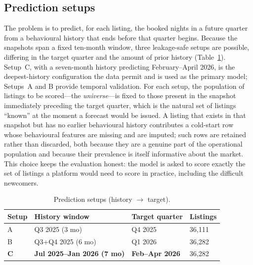 \documentclass[review,12pt]{elsarticle}
\begin{document}
\subsection{Prediction setups}
The problem is to predict, for each listing, the booked nights in a future quarter
from a behavioural history that ends before that quarter begins. Because the
snapshots span a fixed ten-month window, three leakage-safe setups are possible,
differing in the target quarter and the amount of prior history
(Table~\ref{tab:setups}). Setup~C, with a seven-month history predicting
February--April 2026, is the deepest-history configuration the data permit and is
used as the primary model; Setups~A and B provide temporal validation. For each setup, the population of
listings to be scored---the \emph{universe}---is fixed to those present in the
snapshot immediately preceding the target quarter, which is the natural set of
listings ``known'' at the moment a forecast would be issued. A listing that exists
in that snapshot but has no earlier behavioural history contributes a cold-start row
whose behavioural features are missing and are imputed; such rows are retained
rather than discarded, both because they are a genuine part of the operational
population and because their prevalence is itself informative about the market. This
choice keeps the evaluation honest: the model is asked to score exactly the set of
listings a platform would need to score in practice, including the difficult
newcomers.

\begin{table}[!t]
\caption{Prediction setups (history $\rightarrow$ target).}
\label{tab:setups}
\centering
\small
\begin{tabular}{llll}
\toprule
Setup & History window & Target quarter & Listings \\
\midrule
A & Q3 2025 (3 mo) & Q4 2025 & 36,111 \\
B & Q3+Q4 2025 (6 mo) & Q1 2026 & 36,282 \\
\textbf{C} & \textbf{Jul 2025--Jan 2026 (7 mo)} & \textbf{Feb--Apr 2026} & 36,282 \\
\bottomrule
\end{tabular}
\end{table}
\end{document}
